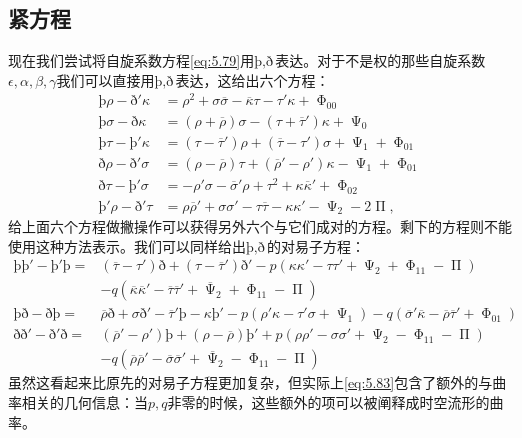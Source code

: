 \subsection{紧方程}

现在我们尝试将自旋系数方程\ref{eq:5.79}用$\text{þ},\text{ð} $表达。对于不是权的那些自旋系数$\epsilon ,\alpha ,\beta ,\gamma $我们可以直接用$\text{þ},\text{ð} $表达，这给出六个方程：
\begin{equation}
	\begin{aligned}
		\text{þ}\rho -\text{ð} '\kappa  & =\rho ^{2} +\sigma \overline{\sigma } -\overline{\kappa } \tau -\tau '\kappa +\upPhi _{00}\\
		\text{þ}\sigma -\text{ð} \kappa  & =(\rho +\overline{\rho } )\sigma -( \tau +\overline{\tau } ') \kappa +\upPsi _{0}\\
		\text{þ}\tau -\text{þ}'\kappa  & =( \tau -\overline{\tau } ') \rho +(\overline{\tau } -\tau ') \sigma +\upPsi _{1} +\upPhi _{01}\\
		\text{ð} \rho -\text{ð} '\sigma  & =(\rho -\overline{\rho } )\tau +(\overline{\rho } '-\rho ') \kappa -\upPsi _{1} +\upPhi _{01}\\
		\text{ð} \tau -\text{þ}'\sigma  & =-\rho '\sigma -\overline{\sigma } '\rho +\tau ^{2} +\kappa \overline{\kappa } '+\upPhi _{02}\\
		\text{þ}'\rho -\text{ð} '\tau  & =\rho \overline{\rho } '+\sigma \sigma '-\tau \overline{\tau } -\kappa \kappa '-\upPsi _{2} -2\upPi ,
	\end{aligned}
	\label{eq:5.82}
\end{equation}
给上面六个方程做撇操作可以获得另外六个与它们成对的方程。剩下的方程则不能使用这种方法表示。我们可以同样给出$\text{þ},\text{ð} $的对易子方程：
\begin{equation}
	\begin{aligned}
		\text{þ}\text{þ}'-\text{þ}'\text{þ}
		= & (\overline{\tau } -\tau ') \text{ð} +( \tau -\overline{\tau } ') \text{ð} '-p( \kappa \kappa '-\tau \tau '+\upPsi _{2} +\upPhi _{11} -\upPi ) \\
		&-q(\overline{\kappa }\overline{\kappa } '-\overline{\tau }\overline{\tau } '+\overline{\upPsi }_{2} +\upPhi _{11} -\upPi )\\
		\text{þ}\text{ð} -\text{ð} \text{þ}
		= & \overline{\rho } \text{ð} +\sigma \text{ð} '-\overline{\tau } '\text{þ}-\kappa \text{þ}'-p( \rho '\kappa -\tau '\sigma +\upPsi _{1}) -q(\overline{\sigma } '\overline{\kappa } -\overline{\rho }\overline{\tau } '+\upPhi _{01})\\
		\text{ð} \text{ð} '-\text{ð} '\text{ð} 
		= & (\overline{\rho } '-\rho ') \text{þ}+(\rho -\overline{\rho } )\text{þ}'+p( \rho \rho '-\sigma \sigma '+\upPsi _{2} -\upPhi _{11} -\upPi ) \\
		&-q(\overline{\rho }\overline{\rho } '-\overline{\sigma }\overline{\sigma } '+\overline{\upPsi }_{2} -\upPhi _{11} -\upPi )
	\end{aligned}
	\label{eq:5.83}
\end{equation}
虽然这看起来比原先的对易子方程更加复杂，但实际上\ref{eq:5.83}包含了额外的与曲率相关的几何信息：当$p,q$非零的时候，这些额外的项可以被阐释成时空流形的曲率。

